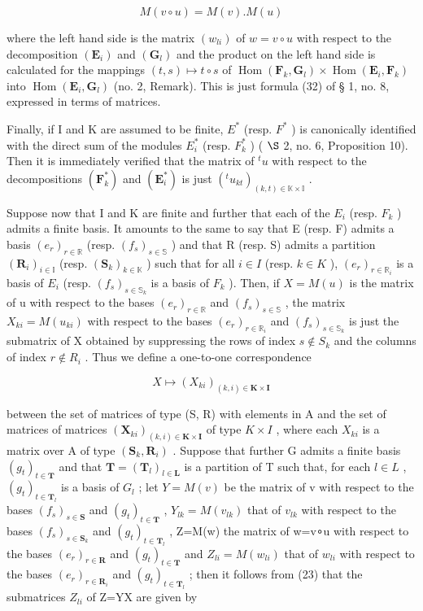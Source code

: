 \[
M (v \circ u) = M (v). M (u)\tag{23}
\]

where the left hand side is the matrix \((w_{li})\) of \(w = v \circ u\) with respect to the decomposition \((\mathbf{E}_i)\) and \((\mathbf{G}_l)\) and the product on the left hand side is calculated for the mappings \((t, s) \mapsto t \circ s\) of \(\operatorname{Hom}(\mathbf{F}_k, \mathbf{G}_l) \times \operatorname{Hom}(\mathbf{E}_i, \mathbf{F}_k)\) into \(\operatorname{Hom}(\mathbf{E}_i, \mathbf{G}_l)\) (no. 2, Remark). This is just formula (32) of § 1, no. 8, expressed in terms of matrices.

Finally, if I and K are assumed to be finite, \(E^{*}\) (resp. \(F^{*}\) ) is canonically identified with the direct sum of the modules \(E_{i}^{*}\) (resp. \(F_{k}^{*}\) ) ( \(\S\) 2, no. 6, Proposition 10). Then it is immediately verified that the matrix of \(^{t}u\) with respect to the decompositions \((\mathbf{F}_{k}^{*})\) and \((\mathbf{E}_{i}^{*})\) is just \((^{t}u_{kt})_{(k,t)\in\mathbb{K}\times\mathbb{I}}\) .

Suppose now that I and K are finite and further that each of the \(E_{i}\) (resp. \(F_{k}\) ) admits a finite basis. It amounts to the same to say that E (resp. F) admits a basis \((e_{r})_{r\in\mathbb{R}}\) (resp. \((f_{s})_{s\in\mathbb{S}}\) ) and that R (resp. S) admits a partition \((\mathbf{R}_{i})_{i\in\mathbb{I}}\) (resp. \((\mathbf{S}_{k})_{k\in\mathbb{K}}\) ) such that for all \(i\in I\) (resp. \(k\in K\) ), \((e_{r})_{r\in\mathbb{R}_{i}}\) is a basis of \(E_{i}\) (resp. \((f_{s})_{s\in\mathbb{S}_{k}}\) is a basis of \(F_{k}\) ). Then, if \(X=M(u)\) is the matrix of u with respect to the bases \((e_{r})_{r\in\mathbb{R}}\) and \((f_{s})_{s\in\mathbb{S}}\) , the matrix \(X_{ki}=M(u_{ki})\) with respect to the bases \((e_{r})_{r\in\mathbb{R}_{i}}\) and \((f_{s})_{s\in\mathbb{S}_{k}}\) is just the submatrix of X obtained by suppressing the rows of index \(s\notin S_{k}\) and the columns of index \(r\notin R_{i}\) . Thus we define a one-to-one correspondence

\[
X \mapsto (X _ {k i}) _ {(k, i) \in \mathbf {K} \times \mathbf {I}}\tag{24}
\]

between the set of matrices of type (S, R) with elements in A and the set of matrices of matrices \((\mathbf{X}_{ki})_{(k,i)\in\mathbf{K}\times\mathbf{I}}\) of type \(K\times I\) , where each \(X_{ki}\) is a matrix over A of type \((\mathbf{S}_{k},\mathbf{R}_{i})\) . Suppose that further G admits a finite basis \((g_{t})_{t\in\mathbf{T}}\) and that \(\mathbf{T}=(\mathbf{T}_{l})_{l\in\mathbf{L}}\) is a partition of T such that, for each \(l\in L\) , \((g_{t})_{t\in\mathbf{T}_{l}}\) is a basis of \(G_{l}\) ; let \(Y=M(v)\) be the matrix of v with respect to the bases \((f_{s})_{s\in\mathbf{S}}\) and \((g_{t})_{t\in\mathbf{T}}\) , \(Y_{lk}=M(v_{lk})\) that of \(v_{lk}\) with respect to the bases \((f_{s})_{s\in\mathbf{S}_{k}}\) and \((g_{t})_{t\in\mathbf{T}_{l}}\) , Z=M(w) the matrix of w=v∘u with respect to the bases \((e_{r})_{r\in\mathbf{R}}\) and \((g_{t})_{t\in\mathbf{T}}\) and \(Z_{li}=M(w_{li})\) that of \(w_{li}\) with respect to the bases \((e_{r})_{r\in\mathbf{R}_{i}}\) and \((g_{t})_{t\in\mathbf{T}_{l}}\) ; then it follows from (23) that the submatrices \(Z_{li}\) of Z=YX are given by

